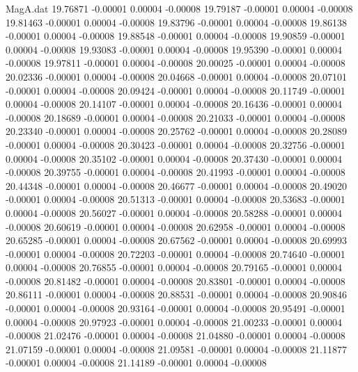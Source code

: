 \begin{filecontents}{MagA.dat}
  19.76871   -0.00001    0.00004   -0.00008
  19.79187   -0.00001    0.00004   -0.00008
  19.81463   -0.00001    0.00004   -0.00008
  19.83796   -0.00001    0.00004   -0.00008
  19.86138   -0.00001    0.00004   -0.00008
  19.88548   -0.00001    0.00004   -0.00008
  19.90859   -0.00001    0.00004   -0.00008
  19.93083   -0.00001    0.00004   -0.00008
  19.95390   -0.00001    0.00004   -0.00008
  19.97811   -0.00001    0.00004   -0.00008
  20.00025   -0.00001    0.00004   -0.00008
  20.02336   -0.00001    0.00004   -0.00008
  20.04668   -0.00001    0.00004   -0.00008
  20.07101   -0.00001    0.00004   -0.00008
  20.09424   -0.00001    0.00004   -0.00008
  20.11749   -0.00001    0.00004   -0.00008
  20.14107   -0.00001    0.00004   -0.00008
  20.16436   -0.00001    0.00004   -0.00008
  20.18689   -0.00001    0.00004   -0.00008
  20.21033   -0.00001    0.00004   -0.00008
  20.23340   -0.00001    0.00004   -0.00008
  20.25762   -0.00001    0.00004   -0.00008
  20.28089   -0.00001    0.00004   -0.00008
  20.30423   -0.00001    0.00004   -0.00008
  20.32756   -0.00001    0.00004   -0.00008
  20.35102   -0.00001    0.00004   -0.00008
  20.37430   -0.00001    0.00004   -0.00008
  20.39755   -0.00001    0.00004   -0.00008
  20.41993   -0.00001    0.00004   -0.00008
  20.44348   -0.00001    0.00004   -0.00008
  20.46677   -0.00001    0.00004   -0.00008
  20.49020   -0.00001    0.00004   -0.00008
  20.51313   -0.00001    0.00004   -0.00008
  20.53683   -0.00001    0.00004   -0.00008
  20.56027   -0.00001    0.00004   -0.00008
  20.58288   -0.00001    0.00004   -0.00008
  20.60619   -0.00001    0.00004   -0.00008
  20.62958   -0.00001    0.00004   -0.00008
  20.65285   -0.00001    0.00004   -0.00008
  20.67562   -0.00001    0.00004   -0.00008
  20.69993   -0.00001    0.00004   -0.00008
  20.72203   -0.00001    0.00004   -0.00008
  20.74640   -0.00001    0.00004   -0.00008
  20.76855   -0.00001    0.00004   -0.00008
  20.79165   -0.00001    0.00004   -0.00008
  20.81482   -0.00001    0.00004   -0.00008
  20.83801   -0.00001    0.00004   -0.00008
  20.86111   -0.00001    0.00004   -0.00008
  20.88531   -0.00001    0.00004   -0.00008
  20.90846   -0.00001    0.00004   -0.00008
  20.93164   -0.00001    0.00004   -0.00008
  20.95491   -0.00001    0.00004   -0.00008
  20.97923   -0.00001    0.00004   -0.00008
  21.00233   -0.00001    0.00004   -0.00008
  21.02476   -0.00001    0.00004   -0.00008
  21.04880   -0.00001    0.00004   -0.00008
  21.07159   -0.00001    0.00004   -0.00008
  21.09581   -0.00001    0.00004   -0.00008
  21.11877   -0.00001    0.00004   -0.00008
  21.14189   -0.00001    0.00004   -0.00008

\end{filecontents}
